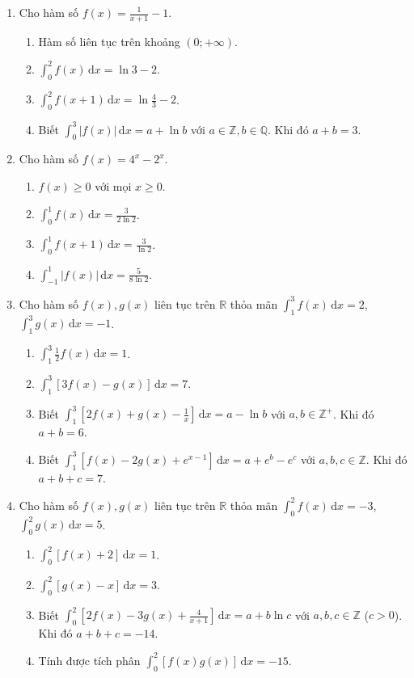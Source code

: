 \documentclass[12pt]{article}
\begin{document}
\begin{enumerate}[label=\textbf{Câu \arabic*.}]
		\item Cho hàm số $f(x) = \frac{1}{x+1} - 1$.
		\begin{enumerate}[label=\alph*)]
			\item Hàm số liên tục trên khoảng $(0; +\infty)$.
			\item $\displaystyle \int_0^2 f(x)\,\mathrm{d}x = \ln 3 - 2$.
			\item $\displaystyle \int_0^2 f(x+1)\,\mathrm{d}x = \ln \frac{4}{3} - 2$.
			\item Biết $\displaystyle \int_0^3 |f(x)|\,\mathrm{d}x = a + \ln b$ với $a \in \mathbb{Z}, b \in \mathbb{Q}$. Khi đó $a + b = 3$.
		\end{enumerate}
		
		\item Cho hàm số $f(x) = 4^x - 2^x$.
		\begin{enumerate}[label=\alph*)]
			\item $f(x) \ge 0$ với mọi $x \ge 0$.
			\item $\displaystyle \int_0^1 f(x)\,\mathrm{d}x = \frac{3}{2\ln 2}$.
			\item $\displaystyle \int_0^1 f(x+1)\,\mathrm{d}x = \frac{3}{\ln 2}$.
			\item $\displaystyle \int_{-1}^1 |f(x)|\,\mathrm{d}x = \frac{5}{8\ln 2}$.
		\end{enumerate}
		
		\item Cho hàm số $f(x), g(x)$ liên tục trên $\mathbb{R}$ thỏa mãn $\displaystyle \int_1^3 f(x)\,\mathrm{d}x = 2$, $\displaystyle \int_1^3 g(x)\,\mathrm{d}x = -1$.
		\begin{enumerate}[label=\alph*)]
			\item $\displaystyle \int_1^3 \frac{1}{2}f(x)\,\mathrm{d}x = 1$.
			\item $\displaystyle \int_1^3 [3f(x) - g(x)]\,\mathrm{d}x = 7$.
			\item Biết $\displaystyle \int_1^3 \left[2f(x) + g(x) - \frac{1}{x}\right]\,\mathrm{d}x = a - \ln b$ với $a, b \in \mathbb{Z}^+$. Khi đó $a+b = 6$.
			\item Biết $\displaystyle \int_1^3 \left[f(x) - 2g(x) + e^{x-1}\right]\,\mathrm{d}x = a + e^b - e^c$ với $a, b, c \in \mathbb{Z}$. Khi đó $a+b+c = 7$.
		\end{enumerate}
		
		\item Cho hàm số $f(x), g(x)$ liên tục trên $\mathbb{R}$ thỏa mãn $\displaystyle \int_0^2 f(x)\,\mathrm{d}x = -3$, $\displaystyle \int_0^2 g(x)\,\mathrm{d}x = 5$.
		\begin{enumerate}[label=\alph*)]
			\item $\displaystyle \int_0^2 [f(x) + 2]\,\mathrm{d}x = 1$.
			\item $\displaystyle \int_0^2 [g(x) - x]\,\mathrm{d}x = 3$.
			\item Biết $\displaystyle \int_0^2 \left[2f(x) - 3g(x) + \frac{4}{x+1}\right]\,\mathrm{d}x = a + b\ln c$ với $a, b, c \in \mathbb{Z}$ ($c > 0$). Khi đó $a+b+c = -14$.
			\item Tính được tích phân $\displaystyle \int_0^2 [f(x)g(x)]\,\mathrm{d}x = -15$.
		\end{enumerate}
		

\end{enumerate}
\end{document}
